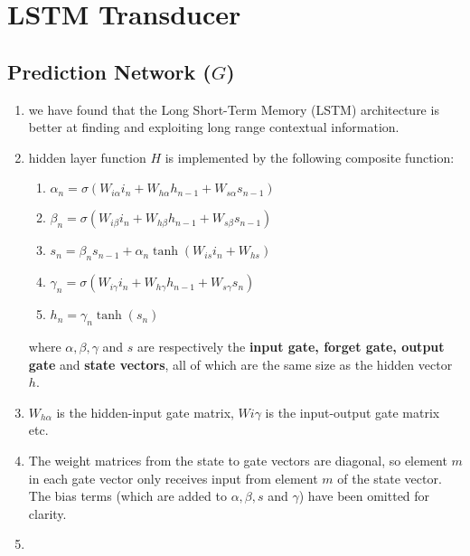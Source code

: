 \section{LSTM Transducer}

\subsection{Prediction Network ($G$)}

\begin{enumerate}
    \item we have found that the Long Short-Term Memory (LSTM) architecture is better at finding and exploiting long range contextual information.
    \hfill \cite{arxiv/1211.3711/Sequence-Transduction-RNN}

    \item hidden layer function $H$ is implemented by the following composite function:
    \begin{multicols}{2}
    \begin{enumerate}
        \item $\alpha _n = \sigma  (W_{i\alpha }i_n + W_{h\alpha }h_{n-1} + W_{s\alpha }s_{n-1})$
        \hfill \cite{arxiv/1211.3711/Sequence-Transduction-RNN}

        \item $\beta _n = \sigma  (W_{i\beta } i_n + W_{h\beta } h_{n-1} + W_{s\beta } s_{n-1})$
        \hfill \cite{arxiv/1211.3711/Sequence-Transduction-RNN}

        \item $s_n = \beta _ns_{n-1} + \alpha _n \tanh (W_{is}i_n + W_{hs}) $
        \hfill \cite{arxiv/1211.3711/Sequence-Transduction-RNN}

        \item $\gamma _n = \sigma  (W_{i\gamma } i_n + W_{h\gamma } h_{n-1} + W_{s\gamma } s_n)$
        \hfill \cite{arxiv/1211.3711/Sequence-Transduction-RNN}

        \item $h_n = \gamma _n \tanh(s_n) $
        \hfill \cite{arxiv/1211.3711/Sequence-Transduction-RNN}
    \end{enumerate}
    \end{multicols}
    where $\alpha, \beta, \gamma$ and $s$ are respectively the \textbf{input gate, forget gate, output gate} and \textbf{state vectors}, all of which are the same size as the hidden vector $h$. 
    \item $W_{h\alpha}$ is the hidden-input gate matrix, $W{i\gamma}$ is the input-output gate matrix etc.
    \hfill \cite{arxiv/1211.3711/Sequence-Transduction-RNN}

    \item The weight matrices from the state to gate vectors are diagonal, so element $m$ in each gate vector only receives input from element $m$ of the state vector. 
    The bias terms (which are added to $\alpha, \beta, s$ and $\gamma$) have been omitted for clarity.
    \hfill \cite{arxiv/1211.3711/Sequence-Transduction-RNN}

    \item 
\end{enumerate}
